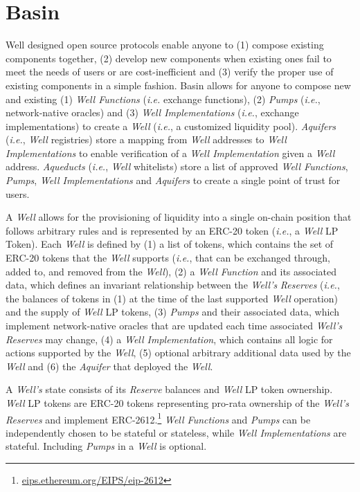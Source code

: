 \documentclass[tikz]{article}
\newcommand{\term}[1]{\textsl{#1}}
\newcommand{\fref}[1]{\footnote{\href{http://#1}{#1}}}
\begin{document}
\section{Basin}
Well designed open source protocols enable anyone to (1) compose existing components together, (2) develop new components when existing ones fail to meet the needs of users or are cost-inefficient and (3) verify the proper use of existing components in a simple fashion. Basin allows for anyone to compose new and existing (1) \term{Well Functions} (\textit{i.e.} exchange functions), (2) \term{Pumps} (\textit{i.e.}, network-native oracles) and (3) \term{Well Implementations} (\textit{i.e.}, exchange implementations) to create a \term{Well} (\textit{i.e.}, a customized liquidity pool). \term{Aquifers} (\textit{i.e.}, \term{Well} registries) store a mapping from \term{Well} addresses to \term{Well Implementations} to enable verification of a \term{Well Implementation} given a \term{Well} address. \term{Aqueducts} (\textit{i.e.}, \term{Well} whitelists) store a list of approved \term{Well Functions}, \term{Pumps}, \term{Well Implementations} and \term{Aquifers} to create a single point of trust for users.

A \term{Well} allows for the provisioning of liquidity into a single on-chain position that follows arbitrary rules and is represented by an ERC-20 token (\textit{i.e.}, a \term{Well} LP Token). Each \term{Well} is defined by (1) a list of tokens, which contains the set of ERC-20 tokens that the \term{Well} supports (\textit{i.e.}, that can be exchanged through, added to, and removed from the \term{Well}), (2) a \term{Well Function} and its associated data, which defines an invariant relationship between the \term{Well's} \term{Reserves} (\textit{i.e.}, the balances of tokens in (1) at the time of the last supported \term{Well} operation) and the supply of \term{Well} LP tokens, (3) \term{Pumps} and their associated data, which implement network-native oracles that are updated each time associated \term{Well's} \term{Reserves} may change, (4) a \term{Well Implementation}, which contains all logic for actions supported by the \term{Well}, (5) optional arbitrary additional data used by the \term{Well} and (6) the \term{Aquifer} that deployed the \term{Well}.

A \term{Well's} state consists of its \term{Reserve} balances and \term{Well} LP token ownership.  \term{Well} LP tokens are ERC-20 tokens representing pro-rata ownership of the \term{Well’s} \term{Reserves} and implement ERC-2612.\fref{eips.ethereum.org/EIPS/eip-2612} \term{Well Functions} and \term{Pumps} can be independently chosen to be stateful or stateless, while \term{Well Implementations} are stateful. Including \term{Pumps} in a \term{Well} is optional.
\end{document}

